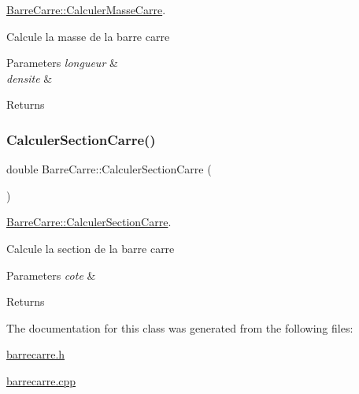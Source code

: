 \hyperlink{class_barre_carre_a5a6899c1d2e1c81e80ef6dd08e4fc756}{Barre\+Carre\+::\+Calculer\+Masse\+Carre}. 

Calcule la masse de la barre carre 
\begin{DoxyParams}{Parameters}
{\em longueur} & \\
\hline
{\em densite} & \\
\hline
\end{DoxyParams}
\begin{DoxyReturn}{Returns}

\end{DoxyReturn}
\mbox{\label{class_barre_carre_afd84f26aa744458aa216859c6a2c20b7}} 
\subsubsection{\texorpdfstring{Calculer\+Section\+Carre()}{CalculerSectionCarre()}}
{\footnotesize\ttfamily double Barre\+Carre\+::\+Calculer\+Section\+Carre (\begin{DoxyParamCaption}{ }\end{DoxyParamCaption})}



\hyperlink{class_barre_carre_afd84f26aa744458aa216859c6a2c20b7}{Barre\+Carre\+::\+Calculer\+Section\+Carre}. 

Calcule la section de la barre carre 
\begin{DoxyParams}{Parameters}
{\em cote} & \\
\hline
\end{DoxyParams}
\begin{DoxyReturn}{Returns}

\end{DoxyReturn}


The documentation for this class was generated from the following files\+:\begin{DoxyCompactItemize}
\item 
\hyperlink{barrecarre_8h}{barrecarre.\+h}\item 
\hyperlink{barrecarre_8cpp}{barrecarre.\+cpp}\end{DoxyCompactItemize}
